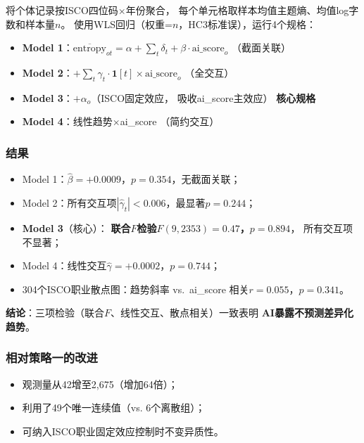 \documentclass[12pt,a4paper]{ctexart}
\begin{document}
将个体记录按ISCO四位码$\times$年份聚合，
每个单元格取样本均值主题熵、均值log字数和样本量$n$。
使用WLS回归（权重=$n$，HC3标准误），运行4个规格：

\begin{itemize}
\item \textbf{Model 1}：$\overline{\text{entropy}}_{ot}
      = \alpha + \sum_t \delta_t + \beta \cdot \text{ai\_score}_o$
      \quad （截面关联）
\item \textbf{Model 2}：$+ \sum_t \gamma_t \cdot \mathbf{1}[t]
      \times \text{ai\_score}_o$
      \quad （全交互）
\item \textbf{Model 3}：$+ \alpha_o$（ISCO固定效应，
      吸收ai\_score主效应）
      \quad \textbf{核心规格}
\item \textbf{Model 4}：线性趋势$\times$ai\_score
      \quad （简约交互）
\end{itemize}

\subsubsection{结果}

\begin{resultbox}[策略二：结果]
\begin{itemize}
\item Model 1：$\hat{\beta} = +0.0009$，$p = 0.354$，无截面关联；
\item Model 2：所有交互项$|\hat{\gamma}_t| < 0.006$，最显著$p=0.244$；
\item \textbf{Model 3}（核心）：
      \textbf{联合$F$检验$F(9, 2353) = 0.47$，$p = 0.894$}，
      所有交互项不显著；
\item Model 4：线性交互$\hat{\gamma} = +0.0002$，$p = 0.744$；
\item 304个ISCO职业散点图：趋势斜率 vs.\ ai\_score
      相关$r = 0.055$，$p = 0.341$。
\end{itemize}
\textbf{结论}：三项检验（联合$F$、线性交互、散点相关）一致表明
\textbf{AI暴露不预测差异化趋势}。
\end{resultbox}

\subsubsection{相对策略一的改进}

\begin{itemize}
\item 观测量从42增至2,675（增加64倍）；
\item 利用了49个唯一连续值（vs. 6个离散组）；
\item 可纳入ISCO职业固定效应控制时不变异质性。
\end{itemize}
\end{document}

